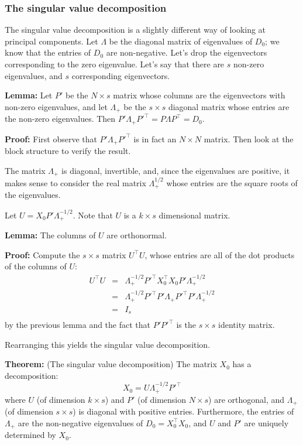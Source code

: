 \documentclass[
]{article}
\begin{document}
\hypertarget{sec:svd}{%
\subsubsection{The singular value decomposition}\label{sec:svd}}

The singular value decomposition is a slightly different way of looking
at principal components. Let \(\Lambda\) be the diagonal matrix of
eigenvalues of \(D_{0}\); we know that the entries of \(D_{0}\) are
non-negative. Let's drop the eigenvectors corresponding to the zero
eigenvalue. Let's say that there are \(s\) non-zero eigenvalues, and
\(s\) corresponding eigenvectors.

\textbf{Lemma:} Let \(P'\) be the \(N\times s\) matrix whose columns are
the eigenvectors with non-zero eigenvalues, and let \(\Lambda_{+}\) be
the \(s\times s\) diagonal matrix whose entries are the non-zero
eigenvalues. Then
\(P'\Lambda_{+} P'^{\intercal} = P\Lambda P^{\intercal} = D_{0}\).

\textbf{Proof:} First observe that \(P'\Lambda_{+}P'^{\intercal}\) is in
fact an \(N\times N\) matrix. Then look at the block structure to verify
the result.

The matrix \(\Lambda_{+}\) is diagonal, invertible, and, since the
eigenvalues are positive, it makes sense to consider the real matrix
\(\Lambda_{+}^{1/2}\) whose entries are the square roots of the
eigenvalues.

Let \(U = X_{0}P'\Lambda_{+}^{-1/2}\). Note that \(U\) is a
\(k\times s\) dimensional matrix.

\textbf{Lemma:} The columns of \(U\) are orthonormal.

\textbf{Proof:} Compute the \(s\times s\) matrix \(U^{\intercal}U\),
whose entries are all of the dot products of the columns of \(U\): \[
\begin{aligned}
U^{\intercal}U &=& \Lambda_{+}^{-1/2}P'^{\intercal}X_{0}^{\intercal}X_{0}P'\Lambda_{+}^{-1/2} \\
&=& \Lambda_{+}^{-1/2}P'^{\intercal}P'\Lambda_{+}P'^{\intercal}P'\Lambda_{+}^{-1/2} \\
&=& I_{s} \\
\end{aligned}
\] by the previous lemma and the fact that \(P'P'^{\intercal}\) is the
\(s\times s\) identity matrix.

Rearranging this yields the singular value decomposition.

\textbf{Theorem:} (The singular value decomposition) The matrix
\(X_{0}\) has a decomposition: \[
X_{0} = U\Lambda_{+}^{-1/2}P'^{\intercal}
\] where \(U\) (of dimension \(k\times s\)) and \(P'\) (of dimension
\(N\times s\)) are orthogonal, and \(\Lambda_{+}\) (of dimension
\(s\times s\)) is diagonal with positive entries. Furthermore, the
entries of \(\Lambda_{+}\) are the non-negative eigenvalues of
\(D_{0}=X_{0}^{\intercal}X_{0}\), and \(U\) and \(P'\) are uniquely
determined by \(X_{0}\).
\end{document}
